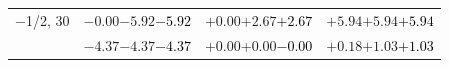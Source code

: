 \documentclass[compress]{beamer}
\begin{document}
\begin{frame}
\begin{tabular}{r | c | c | c}
$-$1/2, 30 & $-0.00$\hspace{0.1 cm}$-5.92$\hspace{0.1 cm}\textcolor{black}{$-5.92$} & $+0.00$\hspace{0.1 cm}$+2.67$\hspace{0.1 cm}\textcolor{black}{$+2.67$} & $+5.94$\hspace{0.1 cm}$+5.94$\hspace{0.1 cm}\textcolor{black}{$+5.94$} \\
           & $-4.37$\hspace{0.1 cm}$-4.37$\hspace{0.1 cm}\textcolor{black}{$-4.37$} & $+0.00$\hspace{0.1 cm}$+0.00$\hspace{0.1 cm}\textcolor{black}{$-0.00$} & $+0.18$\hspace{0.1 cm}$+1.03$\hspace{0.1 cm}\textcolor{black}{$+1.03$} \\
\end{tabular}
\end{frame}
\end{document}
